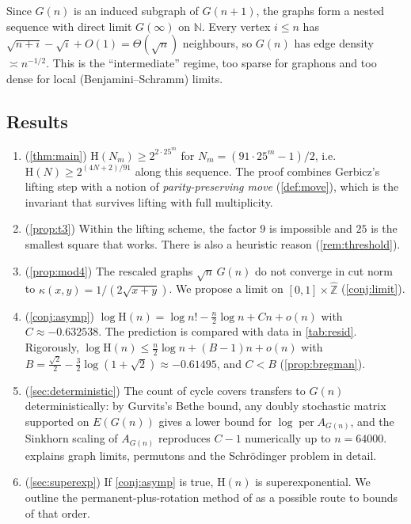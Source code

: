 \documentclass[11pt]{amsart}
\theoremstyle{definition}
\newcommand{\Ham}{\mathrm{H}}
\newcommand{\Zhat}{\widehat{\mathbb{Z}}}
\begin{document}
Since $G(n)$ is an induced subgraph of $G(n+1)$, the graphs form a nested
sequence with direct limit $G(\infty)$ on $\mathbb{N}$. Every vertex $i\le n$ has
$\sqrt{n+i}-\sqrt{i}+O(1)=\Theta(\sqrt n)$ neighbours, so $G(n)$ has edge density
$\asymp n^{-1/2}$. This is the ``intermediate'' regime, too sparse for graphons and too
dense for local (Benjamini--Schramm) limits.

\subsection*{Results}
\begin{enumerate}
\item (\cref{thm:main}) $\Ham(N_m)\ge 2^{2\cdot 25^m}$ for $N_m=(91\cdot25^m-1)/2$,
i.e.\ $\Ham(N)\ge 2^{(4N+2)/91}$ along this sequence. The proof combines Gerbicz's
lifting step with a notion of \emph{parity-preserving move} (\cref{def:move}),
which is the invariant that survives lifting with full multiplicity.
\item (\cref{prop:t3}) Within the lifting scheme, the factor $9$ is impossible
and $25$ is the smallest square that works. There is also a heuristic reason
(\cref{rem:threshold}).
\item (\cref{prop:mod4}) The rescaled graphs $\sqrt n\,G(n)$ do not converge in cut norm to
$\kappa(x,y)=1/(2\sqrt{x+y})$. We propose a limit on $[0,1]\times\Zhat$
(\cref{conj:limit}).
\item (\cref{conj:asymp}) $\log\Ham(n)=\log n!-\frac n2\log n+Cn+o(n)$ with
$C\approx-0.632538$. The prediction is compared with data in \cref{tab:resid}. Rigorously,
$\log\Ham(n)\le\frac n2\log n+(B-1)n+o(n)$ with
$B=\frac{\sqrt2}2-\frac32\log(1+\sqrt2)\approx-0.61495$, and $C<B$ (\cref{prop:bregman}).
\item (\cref{sec:deterministic}) The count of cycle covers transfers to $G(n)$
deterministically: by Gurvits's Bethe bound, any doubly stochastic matrix supported on
$E(G(n))$ gives a lower bound for $\log\operatorname{per}A_{G(n)}$, and the Sinkhorn scaling
of $A_{G(n)}$ reproduces $C-1$ numerically up to $n=64000$.  explains graph
limits, permutons and the Schr\"odinger problem in detail.
\item (\cref{sec:superexp}) If \cref{conj:asymp} is true, $\Ham(n)$ is superexponential.
We outline the permanent-plus-rotation method of
\cite{Krivelevich,GlebovKrivelevich} as a possible route to bounds of that order.
\end{enumerate}
\end{document}
